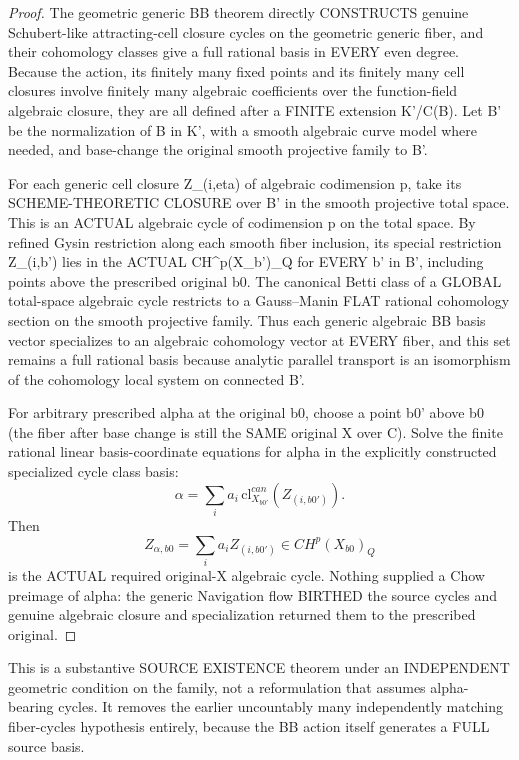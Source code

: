\documentclass[11pt]{article}
\begin{document}
\begin{proof}
The geometric generic BB theorem
directly CONSTRUCTS genuine Schubert-like
attracting-cell closure cycles on the
geometric generic fiber, and their
cohomology classes give a full
rational basis in EVERY even degree.
Because the action, its finitely many
fixed points and its finitely many
cell closures involve finitely many
algebraic coefficients over the
function-field algebraic closure,
they are all defined after a
FINITE extension K'/C(B).
Let B' be the normalization of B
in K', with a smooth algebraic
curve model where needed, and
base-change the original smooth
projective family to B'.

For each generic cell closure
Z_(i,eta) of algebraic codimension p,
take its SCHEME-THEORETIC CLOSURE
over B' in the smooth projective
total space. This is an ACTUAL
algebraic cycle of codimension p
on the total space.
By refined Gysin restriction along
each smooth fiber inclusion,
its special restriction
Z_(i,b') lies in the ACTUAL
CH^p(X_b')_Q for EVERY b' in B',
including points above the
prescribed original b0.
The canonical Betti class of a
GLOBAL total-space algebraic
cycle restricts to a
Gauss--Manin FLAT rational
cohomology section on the smooth
projective family. Thus each
generic algebraic BB basis vector
specializes to an algebraic
cohomology vector at EVERY fiber,
and this set remains a full
rational basis because analytic
parallel transport is an
isomorphism of the cohomology
local system on connected B'.

For arbitrary prescribed
alpha at the original b0,
choose a point b0' above b0
(the fiber after base change is
still the SAME original X over C).
Solve the finite rational
linear basis-coordinate equations
for alpha in the explicitly
constructed specialized cycle
class basis:
\[
\alpha=\sum_i a_i\,
\mathrm{cl}^{can}_{X_{b0'}}
(Z_{(i,b0')}).
\]
Then
\[
\boxed{
Z_{\alpha,b0}
=\sum_i a_i Z_{(i,b0')}
\in CH^p(X_{b0})_Q
}
\]
is the ACTUAL required
original-X algebraic cycle.
Nothing supplied a Chow preimage
of alpha: the generic
Navigation flow BIRTHED the
source cycles and genuine
algebraic closure and
specialization returned them
to the prescribed original.
\end{proof}

This is a substantive SOURCE
EXISTENCE theorem under an
INDEPENDENT geometric condition
on the family, not a reformulation
that assumes alpha-bearing cycles.
It removes the earlier uncountably
many independently matching
fiber-cycles hypothesis entirely,
because the BB action itself
generates a FULL source basis.
\end{document}

